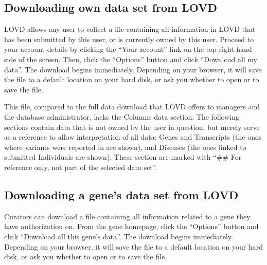 \documentclass[a4paper,oneside,openany,12pt]{memoir}
\renewenvironment{leftbar}[1][\hsize]
{%
    \def\FrameCommand
    {%
        {\color{LOVDdark}\vrule width 3pt \hspace{5pt}}%
        \colorbox{LOVDlight}%
    }%
    \MakeFramed{\hsize#1\advance\hsize-\width\FrameRestore}%
}
{\endMakeFramed}
\begin{document}
\subsection{Downloading own data set from LOVD}
LOVD allows any user to collect a file containing all information in LOVD that has been submitted by this user, or is currently owned by this user.
Proceed to your account details by clicking the ``Your account'' link on the top right-hand side of the screen.
Then, click the ``Options'' button and click ``Download all my data''.
The download begins immediately.
Depending on your browser, it will save the file to a default location on your hard disk, or ask you whether to open or to save the file.

This file, compared to the full data download that LOVD offers to managers and the database administrator, lacks the Columns data section.
The following sections contain data that is not owned by the user in question, but merely serve as a reference to allow interpretation of all data:
 Genes and Transcripts (the ones where variants were reported in are shown), and Diseases (the ones linked to submitted Individuals are shown).
These section are marked with ``\#\# For reference only, not part of the selected data set''.




\hypertarget{ssec:download_gene_data}{}
\subsection{Downloading a gene's data set from LOVD}
Curators can download a file containing all information related to a gene they have authorization on.
From the gene homepage, click the ``Options'' button and click ``Download all this gene's data''.
The download begins immediately.
Depending on your browser, it will save the file to a default location on your hard disk, or ask you whether to open or to save the file.
\end{document}
